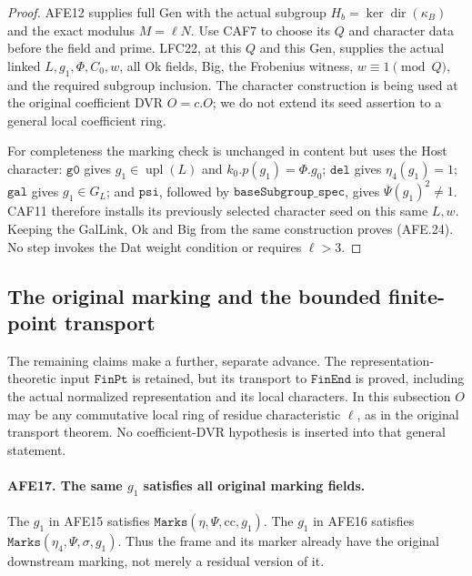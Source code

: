 \begin{proof}
AFE12 supplies full Gen with the actual subgroup
\(H_b=\ker\operatorname{dir}(\kappa_B)\) and
the exact modulus \(M=\ell N\).
Use CAF7 to choose its \(Q\) and character data
before the field and prime.
LFC22, at this \(Q\) and this Gen, supplies
the actual linked \(L,g_1,\Phi,C_0,w\), all Ok
fields, Big, the Frobenius witness,
\(w\equiv1\pmod Q\), and the required subgroup
inclusion.  The character construction is being
used at the original coefficient DVR \(O=c.O\);
we do not extend its seed assertion to a general
local coefficient ring.

For completeness the marking check is unchanged
in content but uses the Host character:
\(\texttt{g0}\) gives \(g_1\in\operatorname{upl}(L)\)
and \(k_0.p(g_1)=\Phi.g_0\);
\(\texttt{del}\) gives \(\eta_4(g_1)=1\);
\(\texttt{gal}\) gives \(g_1\in G_L\);
and \(\texttt{psi}\), followed by
\(\texttt{baseSubgroup\_spec}\), gives
\(\overline\Psi(g_1)^2\ne1\).
CAF11 therefore installs its previously selected
character seed on this same \(L,w\).
Keeping the GalLink, Ok and Big from the same
construction proves (AFE.24).
No step invokes the Dat weight condition or
requires \(\ell>3\).
\end{proof}

\subsection{The original marking and the bounded finite-point transport}

The remaining claims make a further, separate advance.
The representation-theoretic input \(\texttt{FinPt}\)
is retained, but its transport to \(\texttt{FinEnd}\)
is proved, including the actual normalized representation
and its local characters.  In this subsection \(O\) may
be any commutative local ring of residue characteristic
\(\ell\), as in the original transport theorem.
No coefficient-DVR hypothesis is inserted into that
general statement.

\paragraph{AFE17. The same \(g_1\) satisfies all original marking fields.}
\label{claim:AFE17}
The \(g_1\) in AFE15 satisfies
\(\texttt{Marks}(\eta,\Psi,\mathrm{cc},g_1)\).
The \(g_1\) in AFE16 satisfies
\(\texttt{Marks}(\eta_4,\Psi,\sigma,g_1)\).
Thus the frame and its marker already have the
original downstream marking, not merely a residual
version of it.

